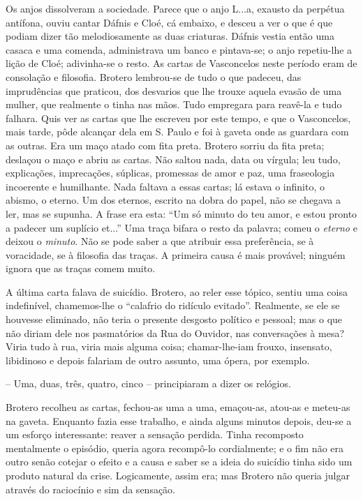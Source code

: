 Os anjos dissolveram a sociedade. Parece que o anjo L...a, exausto da
perpétua antífona, ouviu cantar Dáfnis e Cloé, cá embaixo, e desceu a
ver o que é que podiam dizer tão melodiosamente as duas criaturas.
Dáfnis vestia então uma casaca e uma comenda, administrava um banco e
pintava-se; o anjo repetiu-lhe a lição de Cloé; adivinha-se o resto. As
cartas de Vasconcelos neste período eram de consolação e filosofia.
Brotero lembrou-se de tudo o que padeceu, das imprudências que praticou,
dos desvarios que lhe trouxe aquela evasão de uma mulher, que realmente
o tinha nas mãos. Tudo empregara para reavê-la e tudo falhara. Quis ver
as cartas que lhe escreveu por este tempo, e que o Vasconcelos, mais
tarde, pôde alcançar dela em S. Paulo e foi à gaveta onde as guardara
com as outras. Era um maço atado com fita preta. Brotero sorriu da fita
preta; deslaçou o maço e abriu as cartas. Não saltou nada, data ou
vírgula; leu tudo, explicações, imprecações, súplicas, promessas de amor
e paz, uma fraseologia incoerente e humilhante. Nada faltava a essas
cartas; lá estava o infinito, o abismo, o eterno. Um dos eternos,
escrito na dobra do papel, não se chegava a ler, mas se supunha. A frase
era esta: ``Um só minuto do teu amor, e estou pronto a padecer um
suplício et...'' Uma traça bifara o resto da palavra; comeu o
\emph{eterno} e deixou o \emph{minuto}. Não se pode saber a que atribuir
essa preferência, se à voracidade, se à filosofia das traças. A primeira
causa é mais provável; ninguém ignora que as traças comem muito.

A última carta falava de suicídio. Brotero, ao reler esse tópico, sentiu
uma coisa indefinível, chamemos-lhe o ``calafrio do ridículo evitado''.
Realmente, se ele se houvesse eliminado, não teria o presente desgosto
político e pessoal; mas o que não diriam dele nos pasmatórios da Rua do
Ouvidor, nas conversações à mesa? Viria tudo à rua, viria mais alguma
coisa; chamar-lhe-iam frouxo, insensato, libidinoso e depois falariam de
outro assunto, uma ópera, por exemplo.

-- Uma, duas, três, quatro, cinco -- principiaram a dizer os relógios.

Brotero recolheu as cartas, fechou-as uma a uma, emaçou-as, atou-as e
meteu-as na gaveta. Enquanto fazia esse trabalho, e ainda alguns minutos
depois, deu-se a um esforço interessante: reaver a sensação perdida.
Tinha recomposto mentalmente o episódio, queria agora recompô-lo
cordialmente; e o fim não era outro senão cotejar o efeito e a causa e
saber se a ideia do suicídio tinha sido um produto natural da crise.
Logicamente, assim era; mas Brotero não queria julgar através do
raciocínio e sim da sensação.

